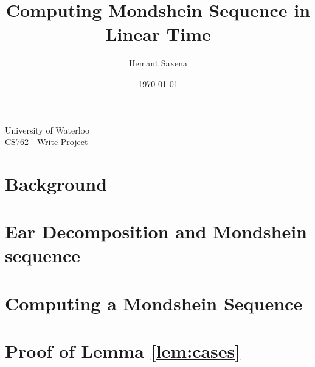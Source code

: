 \documentclass[12pt]{article}
\theoremstyle{plain}
\theoremstyle{definition}
\begin{document}
\begin{titlepage}
\title{Computing Mondshein Sequence in Linear Time}
\author{Hemant Saxena}
\date{\today}
\maketitle
\begin{center}
University of Waterloo \\
CS762 - Write Project
\end{center}
\end{titlepage}


\section{Background} \label{sec:background}


\section{Ear Decomposition and Mondshein sequence} \label{sec:earMond}


\section{Computing a Mondshein Sequence} \label{sec:computingMond}


\section{Proof of Lemma \ref{lem:cases}} \label{sec:proof}




\end{document}
